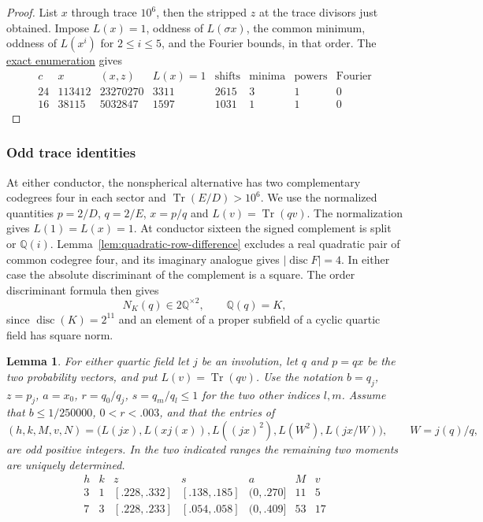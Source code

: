 \documentclass[11pt,reqno]{amsart}
\newcommand{\codecheck}[2]{\href{https://github.com/sebastienpalcoux/grothendieck-ring-classification/blob/d5750105bb5758f3ad38d2e5464dfcc12c019816/supplements/rank6/sphericality/#1}{#2}}
\newtheorem{lemma}[theorem]{Lemma}
\theoremstyle{remark}\newtheorem{remark}[theorem]{Remark}
\numberwithin{equation}{section}
\begin{document}
\begin{proof}
List $x$ through trace $10^6$, then the stripped $z$ at the trace
divisors just obtained. Impose $L(x)=1$, oddness of $L(\sigma x)$,
the common minimum, oddness of $L(x^i)$ for $2\le i\le5$, and the
Fourier bounds, in that order. The
\codecheck{field_checks/half/verify.py}{exact enumeration} gives
\[
\begin{array}{c|r|r|r|r|r|r|r}
 c&x&(x,z)&L(x)=1&\text{shifts}&\text{minima}&\text{powers}&\text{Fourier}\\\hline
 24&113412&23270270&3311&2615&3&1&0\\
 16&38115&5032847&1597&1031&1&1&0
\end{array}
\]
\end{proof}
\subsubsection{Odd trace identities}
At either conductor, the nonspherical alternative has two complementary codegrees four in each sector and $\operatorname{Tr}(E/D)>10^6$. We use the normalized quantities $p=2/D$, $q=2/E$, $x=p/q$ and $L(v)=\operatorname{Tr}(qv)$. The normalization gives $L(1)=L(x)=1$. At conductor sixteen the signed complement is split or $\mathbb Q(i)$.
Lemma~\ref{lem:quadratic-row-difference} excludes a real quadratic
pair of common codegree four, and its imaginary analogue gives
$|\operatorname{disc} F|=4$. In either case the absolute discriminant
of the complement is a square. The order discriminant formula then
gives
\begin{equation}\label{eq:16-common-four-norm}
       N_K(q)\in2\mathbb Q^{\times2},\qquad \mathbb Q(q)=K,
\end{equation}
since $\operatorname{disc}(K)=2^{11}$ and an element of a proper
subfield of a cyclic quartic field has square norm.
\begin{lemma}\label{lem:four-opposite-recovery}
For either quartic field let $j$ be an involution, let $q$ and $p=qx$
be the two probability vectors, and put $L(v)=\operatorname{Tr}(qv)$.
Use the notation $b=q_j$, $z=p_j$, $a=x_0$, $r=q_0/q_j$,
$s=q_m/q_l\le1$ for the two other indices $l,m$. Assume that
$b\le1/250000$, $0<r<.003$, and that the entries of
\[
 (h,k,M,v,N)=
 \bigl(L(jx),L(xj(x)),L((jx)^2),L(W^2),L(jx/W)\bigr),
 \qquad W=j(q)/q,
\]
are odd positive integers. In the two indicated ranges the remaining
two moments are uniquely determined.
\[
\begin{array}{cc|ccc|cc}
 h&k&z&s&a&M&v\\ \hline
 3&1&[.228,.332]&[.138,.185]&(0,.270]&11&5\\
 7&3&[.228,.233]&[.054,.058]&(0,.409]&53&17
\end{array}
\]
\end{lemma}
\end{document}
